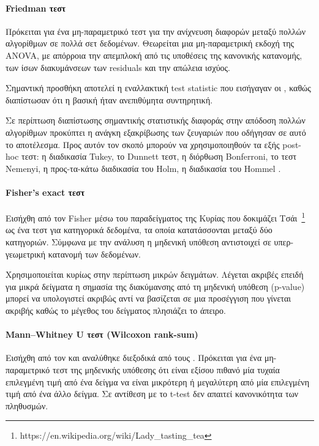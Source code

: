 \paragraph{Friedman τεστ}
Πρόκειται για ένα μη-παραμετρικό τεστ για την ανίχνευση διαφορών μεταξύ πολλών αλγορίθμων σε πολλά σετ δεδομένων. Θεωρείται μια μη-παραμετρική εκδοχή της ANO\-VA, με απόρροια την απεμπλοκή από τις υποθέσεις της κανονικής κατανομής, των ίσων διακυμάνσεων των residuals και την απώλεια ισχύος.  

Σημαντική προσθήκη αποτελεί η εναλλακτική test statistic που εισήγαγαν οι \citet{doi:10.1080/03610928008827904}, καθώς διαπίστωσαν ότι η βασική ήταν ανεπιθύμητα συντηρητική. 

Σε περίπτωση διαπίστωσης σημαντικής στατιστικής διαφοράς στην απόδοση πολλών αλγορίθμων προκύπτει η ανάγκη εξακρίβωσης των ζευγαριών που οδήγησαν σε αυτό το αποτέλεσμα. Προς αυτόν τον σκοπό μπορούν να χρησιμοποιηθούν τα εξής post-hoc τεστ: η διαδικασία Tukey, το Dunnett τεστ, η διόρθωση Bonferroni, το τεστ Nemenyi, η προς-τα-κάτω διαδικασία του Holm, η διαδικασία του Hommel \citep{CIS-57999, citeulike:4294367, doi:10.1093/biomet/75.2.383}.
\paragraph{Fisher's exact τεστ}
 Εισήχθη από τον Fisher μέσω του παραδείγματος της Κυρίας που δοκιμάζει Τσάι~\footnote{https://en.wikipedia.org/wiki/Lady\_tasting\_tea} ως ένα τεστ για κατηγορικά δεδομένα, τα οποία κατατάσσονται μεταξύ δύο κατηγοριών. Σύμφωνα με την ανάλυση η μηδενική υπόθεση αντιστοιχεί σε υπερ-γεωμετρική κατανομή των δεδομένων.
  
 Χρησιμοποιείται κυρίως στην περίπτωση μικρών δειγμάτων. Λέγεται ακριβές επειδή για μικρά δείγματα η σημασία της διακύμανσης από τη μηδενική υπόθεση (p-value) μπορεί να υπολογιστεί ακριβώς αντί να βασίζεται σε μια προσέγγιση που γίνεται ακριβής καθώς το μέγεθος του δείγματος πλησιάζει το άπειρο.
\paragraph{Mann–Whitney U τεστ (Wilcoxon rank-sum)} Εισήχθη από τον \citet{Wilcoxon45} και αναλύθηκε διεξοδικά από τους \citet{mann1947}. Πρόκειται για ένα μη-παραμετρικό τεστ της μηδενικής υπόθεσης ότι είναι εξίσου πιθανό μία τυχαία επιλεγμένη τιμή από ένα δείγμα να είναι μικρότερη ή μεγαλύτερη από μία επιλεγμένη τιμή από ένα άλλο δείγμα. Σε αντίθεση με το t-test δεν απαιτεί κανονικότητα των πληθυσμών.
 
